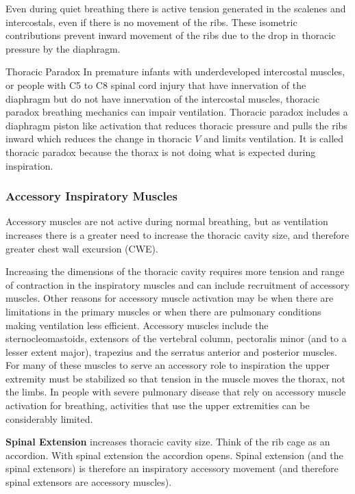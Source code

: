 Even during quiet breathing there is active tension generated in the scalenes and intercostals, even if there is no movement of the ribs. These isometric contributions prevent inward movement of the ribs due to the drop in thoracic pressure by the diaphragm. 

\begin{warning}{Thoracic Paradox}
    In premature infants with underdeveloped intercostal muscles, or people with C5 to C8 spinal cord injury that have innervation of the diaphragm but do not have innervation of the intercostal muscles, thoracic paradox breathing mechanics can impair ventilation. Thoracic paradox includes a diaphragm piston like activation that reduces thoracic pressure and pulls the ribs inward which reduces the change in thoracic $V$ and limits ventilation. It is called thoracic paradox because the thorax is not doing what is expected during inspiration.
\end{warning}
 
\subsubsection{Accessory Inspiratory Muscles}
Accessory muscles are not active during normal breathing, but as ventilation increases there is a greater need to increase the thoracic cavity size, and therefore greater chest wall excursion (CWE).

Increasing the dimensions of the thoracic cavity requires more tension and range of contraction in the inspiratory muscles and can include recruitment of accessory muscles. Other reasons for accessory muscle activation may be when there are limitations in the primary muscles or when there are pulmonary conditions making ventilation less efficient. Accessory muscles include the sternocleomastoids, extensors of the vertebral column, pectoralis minor (and to a lesser extent major), trapezius and the serratus anterior and posterior muscles. For many of these muscles to serve an accessory role to inspiration the upper extremity must be stabilized so that tension in the muscle moves the thorax, not the limbs. In people with severe pulmonary disease that rely on accessory muscle activation for breathing, activities that use the upper extremities can be considerably limited.

\textbf{Spinal Extension} increases thoracic cavity size. Think of the rib cage as an accordion. With spinal extension the accordion opens. Spinal extension (and the spinal extensors) is therefore an inspiratory accessory movement (and therefore spinal extensors are accessory muscles).


